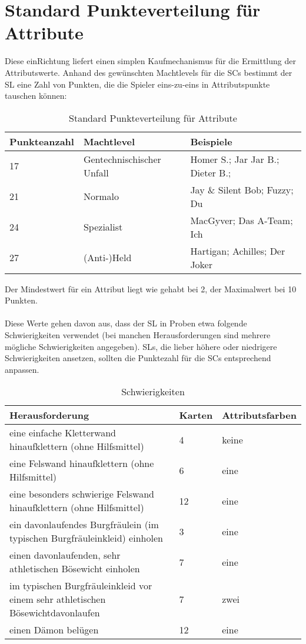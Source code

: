 \section{Standard Punkteverteilung für Attribute}
Diese einRichtung liefert einen simplen Kaufmechanismus für die Ermittlung der Attributswerte. Anhand des gewünschten Machtlevels für die SCs bestimmt der SL eine Zahl von Punkten, die die Spieler eins-zu-eins in Attributspunkte tauschen können:
\begin{table}[H]
\caption{Standard Punkteverteilung für Attribute}
\begin{tabular}{|l|l|l|}
\hline
Punkteanzahl & Machtlevel & Beispiele \\
\hline
17 & Gentechnischischer Unfall & Homer S.; Jar Jar B.; Dieter B.;\\
21 & Normalo & Jay \& Silent Bob; Fuzzy; Du\\
24 & Spezialist & MacGyver; Das A-Team; Ich\\
27 & (Anti-)Held & Hartigan; Achilles; Der Joker\\
\hline
\end{tabular}
\end{table}
Der Mindestwert für ein Attribut liegt wie gehabt bei 2, der Maximalwert bei 10 Punkten. 
\\
\\
Diese Werte gehen davon aus, dass der SL in Proben etwa folgende Schwierigkeiten verwendet (bei manchen Herausforderungen sind mehrere mögliche Schwierigkeiten angegeben). SLs, die lieber höhere oder niedrigere Schwierigkeiten ansetzen, sollten die Punktezahl für die SCs entsprechend anpassen.
\begin{table}[H]
\caption{Schwierigkeiten}
\begin{tabular}{|p{10cm}|l|l|}
\hline
Herausforderung & Karten & Attributsfarben \\
\hline
eine einfache Kletterwand hinaufklettern (ohne Hilfsmittel) & 4 & keine\\
eine Felswand hinaufklettern (ohne Hilfsmittel) & 6 & eine\\
eine besonders schwierige Felswand hinaufklettern (ohne Hilfsmittel) & 	12 & eine\\
ein davonlaufendes Burgfräulein (im typischen Burgfräuleinkleid) einholen & 3 & eine\\
einen davonlaufenden, sehr athletischen Bösewicht einholen & 7 & eine\\
im typischen Burgfräuleinkleid vor einem sehr athletischen Bösewichtdavonlaufen & 7 & zwei\\
einen Dämon belügen & 12 & eine\\
\hline
\end{tabular}
\end{table}
